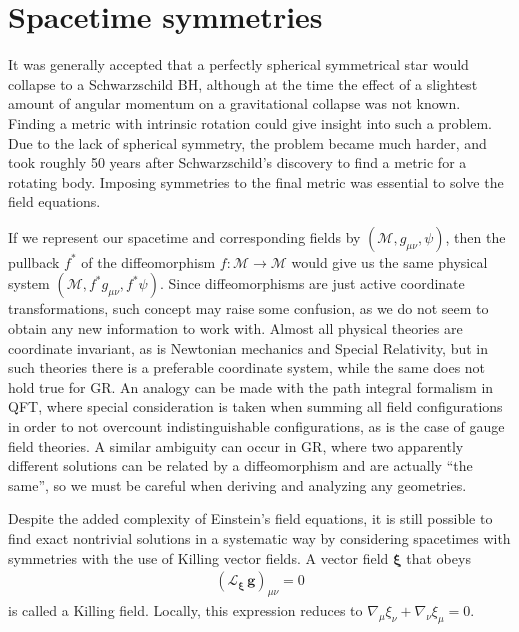 \section{Spacetime symmetries}

It was generally accepted that a perfectly spherical symmetrical star would collapse to a Schwarzschild BH, although at the time the effect of a slightest amount of angular momentum on a gravitational collapse was not known.
Finding a metric with intrinsic rotation could give insight into such a problem. Due to the lack of spherical symmetry, the problem became much harder, and took roughly 50 years after Schwarzschild's discovery to find a metric for a rotating body.
Imposing symmetries to the final metric was essential to solve the field equations.

If we represent our spacetime and corresponding fields by $(\mathscr{M}, g_{\mu\nu}, \psi)$, then the pullback $f^*$ of the diffeomorphism $f:\mathscr{M}\rightarrow\mathscr{M}$ would give us the same physical system $(\mathscr{M}, f^* g_{\mu\nu}, f^* \psi)$.
Since diffeomorphisms are just active coordinate transformations, such concept may raise some confusion, as we do not seem to obtain any new information to work with. 
Almost all physical theories are coordinate invariant, as is Newtonian mechanics and Special Relativity, but in such theories there is a preferable coordinate system, while the same does not hold true for GR.
An analogy can be made with the path integral formalism in QFT, where special consideration is taken when summing all field configurations in order to not overcount indistinguishable configurations, as is the case of gauge field theories.
A similar ambiguity can occur in GR, where two apparently different solutions can be related by a diffeomorphism and are actually ``the same'', so we must be careful when deriving and analyzing any geometries.

Despite the added complexity of Einstein's field equations, it is still possible to find exact nontrivial solutions in a systematic way by considering spacetimes with symmetries with the use of Killing vector fields.
A vector field $\bm{\xi}$ that obeys
\begin{align}
    \left(\mathscr{L}_{\bm{\xi}} \,\bm{g} \right)_{\mu\nu} = 0  
    \label{eq2:killing}
\end{align}
is called a Killing field. Locally, this expression reduces to $\nabla_\mu \xi_\nu + \nabla_\nu \xi_\mu = 0$.

